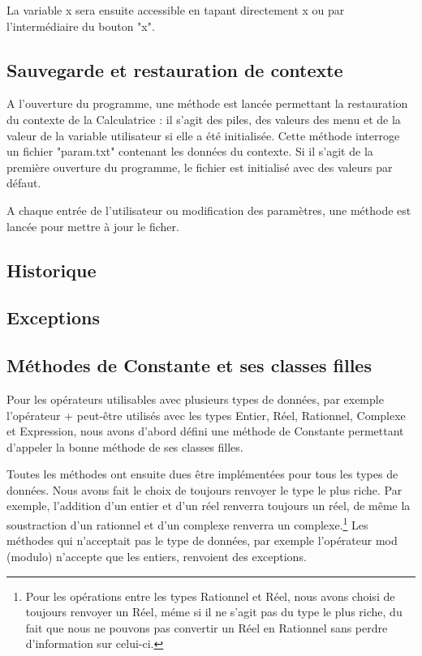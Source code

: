 \documentclass[a4paper,11pt]{article}
\begin{document}
La variable x sera ensuite accessible en tapant directement x ou par l'intermédiaire du bouton "x".

\subsection{Sauvegarde et restauration de contexte}
A l'ouverture du programme, une méthode est lancée permettant la restauration du contexte de la Calculatrice : il s'agit des piles, des valeurs des menu et de la valeur de la variable utilisateur si elle a été initialisée. Cette méthode interroge un fichier "param.txt" contenant les données du contexte. Si il s'agit de la première ouverture du programme, le fichier est initialisé avec des valeurs par défaut.

A chaque entrée de l'utilisateur ou modification des paramètres, une méthode est lancée pour mettre à jour le ficher.

\subsection{Historique}

\subsection{Exceptions}

\subsection{Méthodes de Constante et ses classes filles}
Pour les opérateurs utilisables avec plusieurs types de données, par exemple l'opérateur + peut-être utilisés avec les types Entier, Réel, Rationnel, Complexe et Expression, nous avons d'abord défini une méthode de Constante permettant d'appeler la bonne méthode de ses classes filles.

Toutes les méthodes ont ensuite dues être implémentées pour tous les types de données. Nous avons fait le choix de toujours renvoyer le type le plus riche. Par exemple, l'addition d'un entier et d'un réel renverra toujours un réel, de même la soustraction d'un rationnel et d'un complexe renverra un complexe.\footnote{Pour les opérations entre les types Rationnel et Réel, nous avons choisi de toujours renvoyer un Réel, méme si il ne s'agit pas du type le plus riche, du fait que nous ne pouvons pas convertir un Réel en Rationnel sans perdre d'information sur celui-ci.} Les méthodes qui n'acceptait pas le type de données, par exemple l'opérateur mod (modulo) n'accepte que les entiers, renvoient des exceptions.
\end{document}
